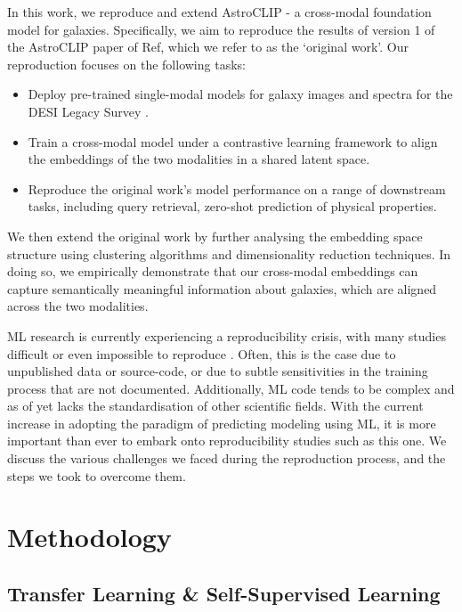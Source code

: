 \documentclass[a4paper,12pt]{article}
\begin{document}
In this work, we reproduce and extend AstroCLIP - a cross-modal foundation model for galaxies. Specifically, we aim to reproduce the results of version 1 of the AstroCLIP paper of Ref\cite{astroclip}, which we refer to as the `original work'. Our reproduction focuses on the following tasks:
\begin{itemize}
    \item Deploy pre-trained single-modal models for galaxy images and spectra for the DESI Legacy Survey \cite{DESI}.
    \item Train a cross-modal model under a contrastive learning framework to align the embeddings of the two modalities in a shared latent space.
    \item Reproduce the original work's model performance on a range of downstream tasks, including query retrieval, zero-shot prediction of physical properties.
\end{itemize}
We then extend the original work by further analysing the embedding space structure using clustering algorithms and dimensionality reduction techniques. In doing so, we empirically demonstrate that our cross-modal embeddings can capture semantically meaningful information about galaxies, which are aligned across the two modalities.

ML research is currently experiencing a reproducibility crisis, with many studies difficult or even impossible to reproduce \cite{kapoor2023leakage}. Often, this is the case due to unpublished data or source-code, or due to subtle sensitivities in the training process that are not documented. Additionally, ML code tends to be complex and as of yet lacks the standardisation of other scientific fields. With the current increase in adopting the paradigm of predicting modeling using ML, it is more important than ever to embark onto reproducibility studies such as this one. We discuss the various challenges we faced during the reproduction process, and the steps we took to overcome them. %



\section{Methodology}
\label{sec:methodology}
\subsection{Transfer Learning \& Self-Supervised Learning}
\label{sec:ssl}
\end{document}
